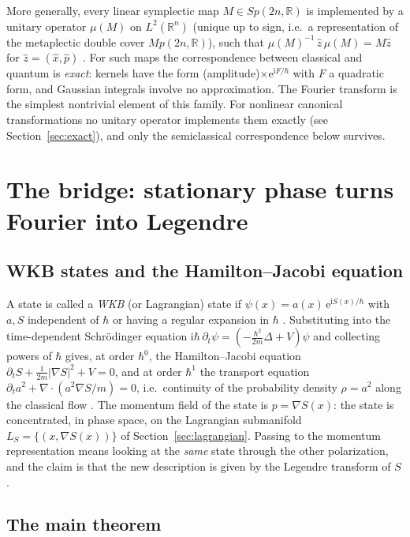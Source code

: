 \documentclass[11pt,a4paper]{article}
\newcommand{\R}{\mathbb{R}}
\newcommand{\ii}{\mathrm{i}}
\newcommand{\ee}{\mathrm{e}}
\newcommand{\hb}{\hbar}
\newcommand{\op}[1]{\hat{#1}}
\theoremstyle{plain}
\theoremstyle{definition}
\theoremstyle{remark}
\begin{document}
More generally, every linear symplectic map $M\in Sp(2n,\R)$ is implemented by a unitary operator $\mu(M)$ on $L^2(\R^n)$ (unique up to sign, i.e.\ a representation of the metaplectic double cover $Mp(2n,\R)$), such that $\mu(M)^{-1}\,\op z\,\mu(M)=M\op z$ for $\op z=(\op x,\op p)$ \cite{Weil,Folland,deGosson2}. For such maps the correspondence between classical and quantum is \emph{exact}: kernels have the form (amplitude)$\times\ee^{\ii F/\hb}$ with $F$ a quadratic form, and Gaussian integrals involve no approximation. The Fourier transform is the simplest nontrivial element of this family. For nonlinear canonical transformations no unitary operator implements them exactly (see Section~\ref{sec:exact}), and only the semiclassical correspondence below survives.

\section{The bridge: stationary phase turns Fourier into Legendre}\label{sec:bridge}

\subsection{WKB states and the Hamilton--Jacobi equation}

A state is called a \emph{WKB} (or Lagrangian) state if $\psi(x)=a(x)\,\ee^{\ii S(x)/\hb}$ with $a,S$ independent of $\hb$ or having a regular expansion in $\hb$ \cite{Maslov,MaslovFedoriuk,Littlejohn}. Substituting into the time-dependent Schr\"odinger equation $\ii\hb\,\partial_t\psi=(-\tfrac{\hb^2}{2m}\Delta+V)\psi$ and collecting powers of $\hb$ gives, at order $\hb^0$, the Hamilton--Jacobi equation $\partial_tS+\tfrac{1}{2m}|\nabla S|^2+V=0$, and at order $\hb^1$ the transport equation $\partial_t a^2+\nabla\cdot(a^2\nabla S/m)=0$, i.e.\ continuity of the probability density $\rho=a^2$ along the classical flow \cite{LL3,Berry}. The momentum field of the state is $p=\nabla S(x)$: the state is concentrated, in phase space, on the Lagrangian submanifold $L_S=\{(x,\nabla S(x))\}$ of Section~\ref{sec:lagrangian}. Passing to the momentum representation means looking at the \emph{same} state through the other polarization, and the claim is that the new description is given by the Legendre transform of $S$.

\subsection{The main theorem}
\end{document}

